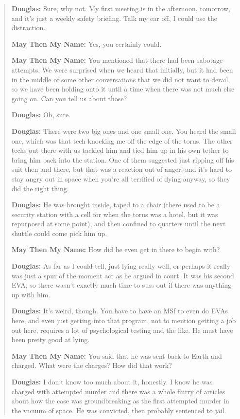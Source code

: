 \begin{quote}
\textbf{Douglas:} Sure, why not. My first meeting is in the afternoon, tomorrow, and it's just a weekly safety briefing. Talk my ear off, I could use the distraction.

\textbf{May Then My Name:} Yes, you certainly could.

\textbf{May Then My Name:} You mentioned that there had been sabotage attempts. We were surprised when we heard that initially, but it had been in the middle of some other conversations that we did not want to derail, so we have been holding onto it until a time when there was not much else going on. Can you tell us about those?

\textbf{Douglas:} Oh, sure.

\textbf{Douglas:} There were two big ones and one small one. You heard the small one, which was that tech knocking me off the edge of the torus. The other techs out there with us tackled him and tied him up in his own tether to bring him back into the station. One of them suggested just ripping off his suit then and there, but that was a reaction out of anger, and it's hard to stay angry out in space when you're all terrified of dying anyway, so they did the right thing.

\textbf{Douglas:} He was brought inside, taped to a chair (there used to be a security station with a cell for when the torus was a hotel, but it was repurposed at some point), and then confined to quarters until the next shuttle could come pick him up.

\textbf{May Then My Name:} How did he even get in there to begin with?

\textbf{Douglas:} As far as I could tell, just lying really well, or perhaps it really was just a spur of the moment act as he argued in court. It was his second EVA, so there wasn't exactly much time to suss out if there was anything up with him.

\textbf{Douglas:} It's weird, though. You have to have an MSf to even do EVAs here, and even just getting into that program, not to mention getting a job out here, requires a lot of psychological testing and the like. He must have been pretty good at lying.

\textbf{May Then My Name:} You said that he was sent back to Earth and charged. What were the charges? How did that work?

\textbf{Douglas:} I don't know too much about it, honestly. I know he was charged with attempted murder and there was a whole flurry of articles about how the case was groundbreaking as the first attempted murder in the vacuum of space. He was convicted, then probably sentenced to jail.


\end{quote}

